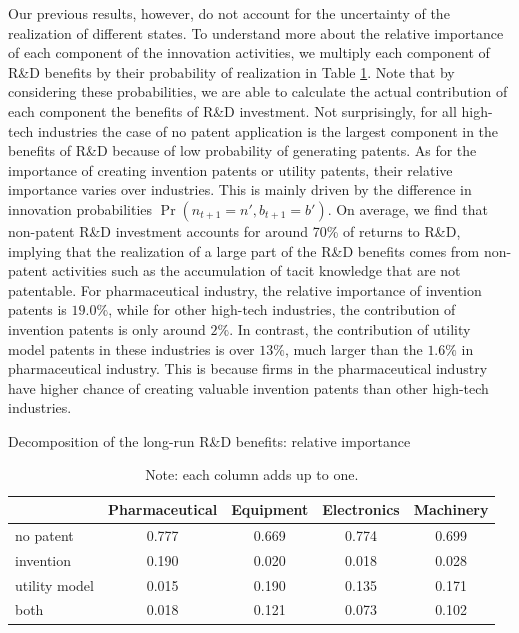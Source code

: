 \documentclass[11pt]{article}
\begin{document}
Our previous results, however, do not account for the uncertainty of the realization of different states. To understand more about the relative importance of each component of the innovation activities, we multiply each component of R\&D benefits by their probability of realization in Table \ref{T17D}. Note that by considering these probabilities, we are able to calculate the actual contribution of each component the benefits of R\&D investment. Not surprisingly, for all high-tech industries the case of no patent application is the largest component in the benefits of R\&D because of low probability of generating patents. As for the importance of creating invention patents or utility patents, their relative importance varies over industries. This is mainly driven by the difference in innovation probabilities $\Pr(n_{t+1}=n',b_{t+1}=b')$. On average, we find that non-patent R\&D investment accounts for around 70\% of returns to R\&D, implying that the realization of a large part of the R\&D benefits comes from non-patent activities such as the accumulation of tacit knowledge that are not patentable.  For pharmaceutical industry, the relative importance of invention patents is $19.0\%$, while for other high-tech industries, the contribution of invention patents is only around $2\%$. In contrast, the contribution of utility model patents in these industries is over $13\%$, much larger than the $1.6\%$ in pharmaceutical industry. This is because firms in the pharmaceutical industry have higher chance of creating valuable invention patents than other high-tech industries.
\begin{table}[h] %
    \centering
    \caption{Decomposition of the long-run R\&D benefits: relative importance}
    \label{T17D}
    \begin{tabular}{lcccc}
    \toprule
                  &Pharmaceutical & Equipment & Electronics & Machinery\\
    \hline
    no patent  & 0.777 & 0.669 & 0.774 & 0.699 \\
    invention  & 0.190 & 0.020 & 0.018 & 0.028 \\
    utility model   & 0.015 & 0.190 & 0.135 & 0.171 \\
    both       & 0.018 & 0.121 & 0.073 & 0.102 \\
    \bottomrule
    \end{tabular}
    \caption*{\small{}Note: each column adds up to one.}{\small \par}
    \end{table}
\end{document}
